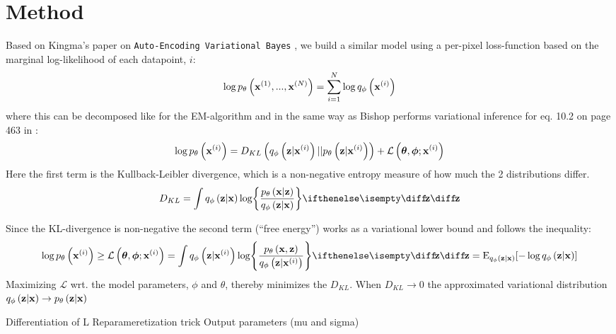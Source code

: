 \section{Method}
\label{sec:method}

Based on Kingma's paper on \texttt{Auto-Encoding Variational Bayes} \cite{Kingma2014}, we build a similar model using a per-pixel loss-function based on the marginal log-likelihood of each datapoint, $i$:
\begin{equation}
	\log p_{\theta}\left(\bm{\mathrm{x}}^{(1)}, ..., \bm{\mathrm{x}}^{(N)}\right) = \sum^N_{i=1} \log q_{\phi}\left(\bm{\mathrm{x}}^{(i)}\right) 
\end{equation}
where this can be decomposed like for the EM-algorithm and in the same way as Bishop performs variational inference for eq. 10.2 on page 463 in \cite{Bishop2006}:
\begin{equation}
	\log p_{\theta}\left(\bm{\mathrm{x}}^{(i)}\right) = D_{KL}\left( q_{\phi}\left(\bm{\mathrm{z}}|\bm{\mathrm{x}}^{(i)}\right)||p_{\theta}\left(\bm{\mathrm{z}}|\bm{\mathrm{x}}^{(i)}\right)\right) + \mathcal{L}\left(\bm{\mathrm{\theta}},\bm{\mathrm{\phi}};\bm{\mathrm{x}}^{(i)}\right)
\end{equation} 
Here the first term is the Kullback-Leibler divergence, which is a non-negative entropy measure of how much the 2 distributions differ.
\begin{equation}
	D_{KL} = \int \enc{\vec{z}|\vec{x}} \log \curlies*{ \frac{\dec{\vec{x}|\vec{z}}}{\enc{\vec{z}|\vec{x}} } } \D{\vec{z}}
\end{equation}

Since the KL-divergence is non-negative the second term (``free energy'') works as a variational lower bound and follows the inequality:
\begin{align}
	\log \dec{\vec{x}\order{i}} \ge \mathcal{L}\left(\vec{\theta},\vec{\phi};\vec{x}\order{i}\right) = \int \enc{\vec{z}|\vec{x}\order{i}} \log \curlies*{ \frac{\dec{\vec{x},\vec{z}}}{\enc{\vec{z}|\vec{x}\order{i}} } } \D{\vec{z}} = \E_{\enc{\vec{z}|\vec{x}}} [- \log \enc{\vec{z}|\vec{x}}] 	
\end{align} 
Maximizing $\mathcal{L}$ wrt. the model parameters, $\phi$ and $\theta$, thereby minimizes the $D_{KL}$. When $D_{KL}\rightarrow 0$ the approximated variational distribution $q_{\phi}\left(\bm{\mathrm{z}}|\bm{\mathrm{x}}\right)\rightarrow p_{\theta}\left(\bm{\mathrm{z}}|\bm{\mathrm{x}}\right)$

Differentiation of L
Reparameretization trick
Output parameters (mu and sigma)
